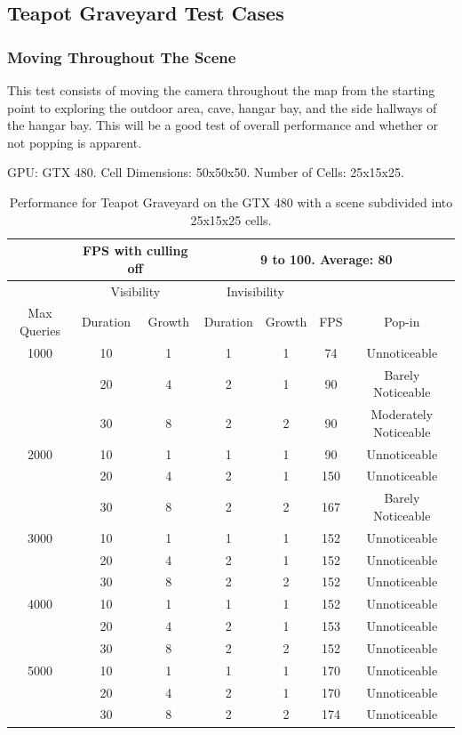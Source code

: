 \documentclass[12pt]{ucthesis}
\newcommand{\captionfonts}{\small\bf\ssp}
\begin{document}
\subsection{Teapot Graveyard Test Cases}
\label{graveyard-test-cases}

\subsubsection{Moving Throughout The Scene}
\label{graveyard-moving-throught-the-scene}

This test consists of moving the camera throughout the map from the starting point to exploring the outdoor area, cave, hangar bay, and the side hallways of the hangar bay.
This will be a good test of overall performance and whether or not popping is apparent.

\begin{table}
\begin{center}
GPU: GTX 480.   Cell Dimensions: 50x50x50.   Number of Cells: 25x15x25.
\begin{tabular}{|c|c|c|c|c|c|c|}
\hline
&\multicolumn{2}{c|}{FPS with culling off}&\multicolumn{4}{c|}{9 to 100.  Average: 80}
\tabularnewline
\hline 
&\multicolumn{2}{c|}{Visibility}&\multicolumn{2}{c|}{Invisibility}&&
\tabularnewline
Max Queries&Duration&Growth&Duration&Growth&FPS&Pop-in
\tabularnewline
\hline
1000 & 10& 1& 1& 1& 74& Unnoticeable
\tabularnewline
     & 20& 4& 2& 1& 90& Barely Noticeable
\tabularnewline
     & 30& 8& 2& 2& 90& Moderately Noticeable
\tabularnewline
\hline
2000 & 10& 1& 1& 1& 90& Unnoticeable
\tabularnewline
     & 20& 4& 2& 1& 150& Unnoticeable
\tabularnewline
     & 30& 8& 2& 2& 167& Barely Noticeable
\tabularnewline
\hline
3000 & 10& 1& 1& 1& 152& Unnoticeable
\tabularnewline
     & 20& 4& 2& 1& 152& Unnoticeable
\tabularnewline
     & 30& 8& 2& 2& 152& Unnoticeable
\tabularnewline
\hline
4000 & 10& 1& 1& 1& 152& Unnoticeable
\tabularnewline
     & 20& 4& 2& 1& 153& Unnoticeable
\tabularnewline
     & 30& 8& 2& 2& 152& Unnoticeable
\tabularnewline
\hline
5000 & 10& 1& 1& 1& 170& Unnoticeable
\tabularnewline
     & 20& 4& 2& 1& 170& Unnoticeable
\tabularnewline
     & 30& 8& 2& 2& 174& Unnoticeable
\tabularnewline
\hline 
\end{tabular}
\captionfonts
\caption[Performance for Teapot Graveyard]{Performance for Teapot Graveyard on the GTX 480 with a scene subdivided into 25x15x25 cells.}
\label{table:graveyard-a}
\end{center}
\end{table}
\end{document}
